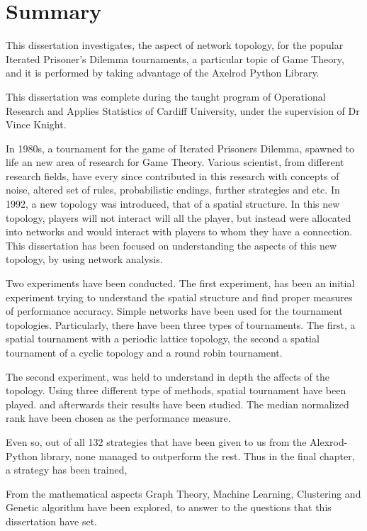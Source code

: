 \chapter{Summary}
This dissertation investigates, the aspect of network topology, for the popular
Iterated Prisoner's Dilemma tournaments, a particular topic of  Game
Theory, and it is performed by taking advantage of the Axelrod Python Library.

This dissertation was complete during the taught program of Operational Research
and Applies Statistics of Cardiff University, under the supervision of Dr Vince
Knight.

In 1980s, a tournament for the game of Iterated Prisoners Dilemma, spawned to
life an new area of research for Game Theory. Various scientist, from different
research fields, have every since contributed in this research with concepts
of noise, altered set of rules, probabilistic endings, further strategies and etc.
In 1992, a new topology was introduced, that of a spatial structure. In this
new topology, players will not interact will all the player, but instead were
allocated into networks and would interact with players to whom they have a
connection. This dissertation has been focused on understanding the aspects of
this new topology, by using network analysis.

Two experiments have been conducted. The first experiment, has been an initial
experiment trying to understand the spatial structure and find proper measures
of performance accuracy. Simple networks have been used for the tournament
topologies. Particularly, there have been three types of tournaments.
The first, a spatial tournament with a periodic lattice topology, the
second a spatial tournament of a cyclic topology and a round robin tournament.

The second experiment, was held to understand in depth the affects of the
topology. Using three different type of methods, spatial tournament have been
played. and afterwards their results have been studied. The median normalized
rank have been chosen as the performance measure.

Even so, out of all 132 strategies that have been given to us from the Alexrod- Python
library, none managed to outperform the rest. Thus in the final chapter, a
strategy has been trained,

From the mathematical aspects Graph Theory, Machine Learning, Clustering and
Genetic algorithm have been explored, to answer to the questions that this
dissertation have set.
